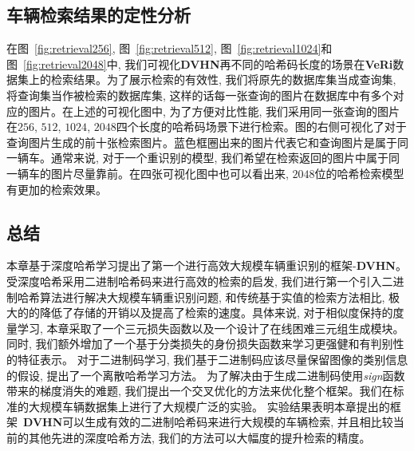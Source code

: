 \subsection{车辆检索结果的定性分析}
在图~\ref{fig:retrieval256}, 图~\ref{fig:retrieval512}, 图~\ref{fig:retrieval1024}和图~\ref{fig:retrieval2048}中, 我们可视化\textbf{DVHN}再不同的哈希码长度的场景在\textbf{VeRi}数据集上的检索结果。为了展示检索的有效性, 我们将原先的数据库集当成查询集, 将查询集当作被检索的数据库集, 这样的话每一张查询的图片在数据库中有多个对应的图片。在上述的可视化图中, 为了方便对比性能, 我们采用同一张查询的图片在$256$, $512$, $1024$, $2048$四个长度的哈希码场景下进行检索。图的右侧可视化了对于查询图片生成的前十张检索图片。蓝色框圈出来的图片代表它和查询图片是属于同一辆车。通常来说, 对于一个重识别的模型, 我们希望在检索返回的图片中属于同一辆车的图片尽量靠前。在四张可视化图中也可以看出来, $2048$位的哈希检索模型有更加的检索效果。
\subsection{总结}
本章基于深度哈希学习提出了第一个进行高效大规模车辆重识别的框架-\textbf{DVHN}。受深度哈希采用二进制哈希码来进行高效的检索的启发, 我们进行第一个引入二进制哈希算法进行解决大规模车辆重识别问题, 和传统基于实值的检索方法相比, 极大的的降低了存储的开销以及提高了检索的速度。具体来说, 对于相似度保持的度量学习, 本章采取了一个三元损失函数以及一个设计了在线困难三元组生成模块。同时, 我们额外增加了一个基于分类损失的身份损失函数来学习更强健和有判别性的特征表示。 对于二进制码学习, 我们基于二进制码应该尽量保留图像的类别信息的假设, 提出了一个离散哈希学习方法。 为了解决由于生成二进制码使用\textit{sign}函数带来的梯度消失的难题, 我们提出一个交叉优化的方法来优化整个框架。我们在标准的大规模车辆数据集上进行了大规模广泛的实验。 实验结果表明本章提出的框架~\textbf{DVHN}可以生成有效的二进制哈希码来进行大规模的车辆检索, 并且相比较当前的其他先进的深度哈希方法, 我们的方法可以大幅度的提升检索的精度。

